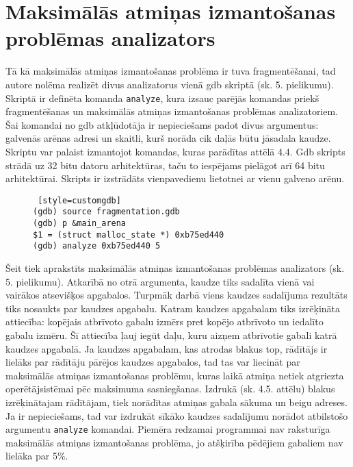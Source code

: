 \section{Maksimālās atmiņas izmantošanas problēmas analizators}
Tā kā maksimālās atmiņas izmantošanas problēma ir tuva fragmentēšanai, tad autore nolēma realizēt divus analizatorus vienā gdb skriptā (sk. 5. pielikumu).
Skriptā ir definēta komanda \texttt{analyze}, kura izsauc parējās komandas priekš fragmentēšanas un maksimālās atmiņas izmantošanas problēmas analizatoriem.
Šai komandai no gdb atkļūdotāja ir nepieciešams padot divus argumentus: galvenās arēnas adresi un skaitli, kurš norāda cik daļās būtu jāsadala kaudze.
Skriptu var palaist izmantojot komandas, kuras parādītas attēlā 4.4.
Gdb skripts strādā uz 32 bitu datoru arhitektūras, taču to iespējams pielāgot arī 64 bitu arhitektūrai.
Skripts ir izstrādāts vienpavedienu lietotnei ar vienu galveno arēnu.

\begin{figure}[h]
\begin{lstlisting} [style=customgdb]
(gdb) source fragmentation.gdb
(gdb) p &main_arena
$1 = (struct malloc_state *) 0xb75ed440
(gdb) analyze 0xb75ed440 5
\end{lstlisting}
\caption{\textbf{\fontsize{11}{12}\selectfont {Gdb skripta palaišana}}}
\end{figure} %


Šeit tiek aprakstīts maksimālās atmiņas izmantošanas problēmas analizators (sk. 5. pielikumu).
Atkarībā no otrā argumenta, kaudze tiks sadalīta vienā vai vairākos atsevišķos apgabalos.
Turpmāk darbā viens kaudzes sadalījuma rezultāts tiks nosaukts par kaudzes apgabalu.
Katram kaudzes apgabalam tiks izrēķināta attiecība: kopējais atbrīvoto gabalu izmērs pret kopējo atbrīvoto un iedalīto gabalu izmēru.
Šī attiecība ļauj iegūt daļu, kuru aizņem atbrīvotie gabali katrā kaudzes apgabalā.
Ja kaudzes apgabalam, kas atrodas blakus top, rādītājs ir lielāks par rādītāju pārējos kaudzes apgabalos, tad tas var liecināt par maksimālās atmiņas izmantošanas problēmu, kuras laikā atmiņa netiek atgriezta operētājsistēmai pēc maksimuma sasniegšanas.
Izdrukā (sk. 4.5. attēlu) blakus izrēķinātajam rādītājam, tiek norādītas atmiņas gabala sākuma un beigu adreses.
Ja ir nepieciešams, tad var izdrukāt sīkāko kaudzes sadalījumu norādot atbilstošo argumentu \texttt{analyze} komandai.
Piemēra redzamai programmai nav raksturīga maksimālās atmiņas izmantošanas problēma, jo atšķirība pēdējiem gabaliem nav lielāka par 5\%.

